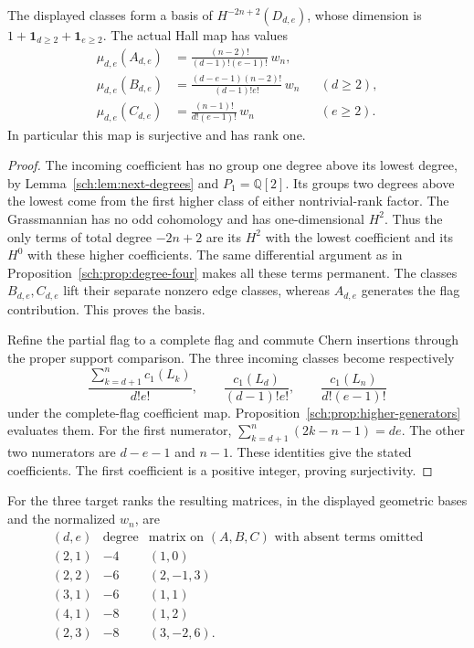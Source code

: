 \begin{theorem}
\label{sch:thm:binary-higher}
The displayed classes form a basis of
$H^{-2n+2}(D_{d,e})$, whose dimension is
$1+\mathbf 1_{d\geq2}+\mathbf 1_{e\geq2}$.
The actual Hall map has values
\[
 \begin{aligned}
 \mu_{d,e}(A_{d,e})
    &=\frac{(n-2)!}{(d-1)!(e-1)!}\,w_n,\\
 \mu_{d,e}(B_{d,e})
    &=\frac{(d-e-1)(n-2)!}{(d-1)!e!}\,w_n &&(d\geq2),\\
 \mu_{d,e}(C_{d,e})
    &=\frac{(n-1)!}{d!(e-1)!}\,w_n &&(e\geq2).
 \end{aligned}
\]
In particular this map is surjective and has rank one.
\end{theorem}

\begin{proof}
The incoming coefficient has no group one degree above its lowest
degree, by Lemma~\ref{sch:lem:next-degrees} and $P_1=\mathbb Q[2]$.
Its groups two degrees above the lowest come from the first higher
class of either nontrivial-rank factor.
The Grassmannian has no odd cohomology and has one-dimensional $H^2$.
Thus the only terms of total degree $-2n+2$ are its $H^2$ with
the lowest coefficient and its $H^0$ with these higher coefficients.
The same differential argument as in
Proposition~\ref{sch:prop:degree-four} makes all these terms permanent.
The classes $B_{d,e},C_{d,e}$ lift their separate nonzero edge classes,
whereas $A_{d,e}$ generates the flag contribution. This proves the basis.

Refine the partial flag to a complete flag and commute Chern
insertions through the proper support comparison.
The three incoming classes become respectively
\[
 \frac{\sum_{k=d+1}^{n}c_1(L_k)}{d!e!},\qquad
 \frac{c_1(L_d)}{(d-1)!e!},\qquad
 \frac{c_1(L_n)}{d!(e-1)!}
\]
under the complete-flag coefficient map.
Proposition~\ref{sch:prop:higher-generators} evaluates them.
For the first numerator,
$\sum_{k=d+1}^{n}(2k-n-1)=de$.
The other two numerators are $d-e-1$ and $n-1$.
These identities give the stated coefficients.
The first coefficient is a positive integer, proving surjectivity.
\end{proof}

For the three target ranks the resulting matrices, in the displayed
geometric bases and the normalized $w_n$, are
\[
\begin{array}{c|c|c}
 (d,e)&\text{degree}&\text{matrix on }(A,B,C)\text{ with absent terms omitted}\\\hline
 (2,1)&-4&(1,0)\\
 (2,2)&-6&(2,-1,3)\\
 (3,1)&-6&(1,1)\\
 (4,1)&-8&(1,2)\\
 (2,3)&-8&(3,-2,6).
\end{array}
\]

